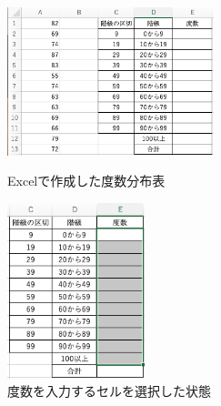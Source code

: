 \begin{figure}[htbp]
    \begin{minipage}{0.5\hsize}
        \centering
        \includegraphics[width=6cm]{chap1/before_freq.png}
        \caption{Excelで作成した度数分布表}
        \label{fig:before_freq}
    \end{minipage}
    \begin{minipage}{0.5\hsize}
        \centering
        \includegraphics[width=4cm]{chap1/select_cells_freq.png}
        \caption{度数を入力するセルを選択した状態}
        \label{fig:select_cells_freq}
    \end{minipage}
\end{figure}


